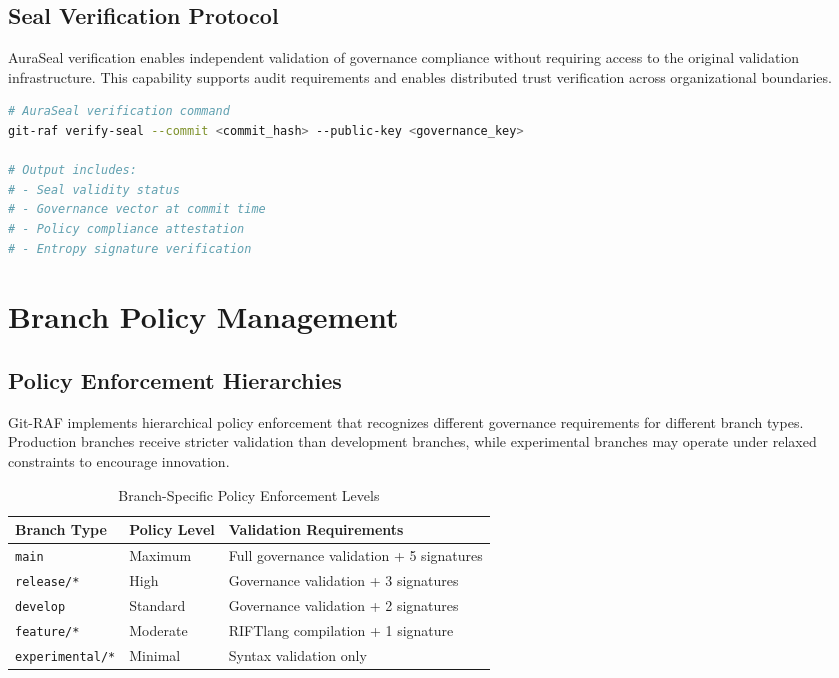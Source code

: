 \subsection{Seal Verification Protocol}

AuraSeal verification enables independent validation of governance compliance without requiring access to the original validation infrastructure. This capability supports audit requirements and enables distributed trust verification across organizational boundaries.

\begin{lstlisting}[style=riftlang, language=bash]
# AuraSeal verification command
git-raf verify-seal --commit <commit_hash> --public-key <governance_key>

# Output includes:
# - Seal validity status
# - Governance vector at commit time  
# - Policy compliance attestation
# - Entropy signature verification
\end{lstlisting}

\section{Branch Policy Management}

\subsection{Policy Enforcement Hierarchies}

Git-RAF implements hierarchical policy enforcement that recognizes different governance requirements for different branch types. Production branches receive stricter validation than development branches, while experimental branches may operate under relaxed constraints to encourage innovation.

\begin{table}[h]
\centering
\begin{tabular}{|l|l|l|}
\hline
\textbf{Branch Type} & \textbf{Policy Level} & \textbf{Validation Requirements} \\
\hline
\texttt{main} & Maximum & Full governance validation + 5 signatures \\
\texttt{release/*} & High & Governance validation + 3 signatures \\
\texttt{develop} & Standard & Governance validation + 2 signatures \\
\texttt{feature/*} & Moderate & RIFTlang compilation + 1 signature \\
\texttt{experimental/*} & Minimal & Syntax validation only \\
\hline
\end{tabular}
\caption{Branch-Specific Policy Enforcement Levels}
\label{tab:branch_policies}
\end{table}

